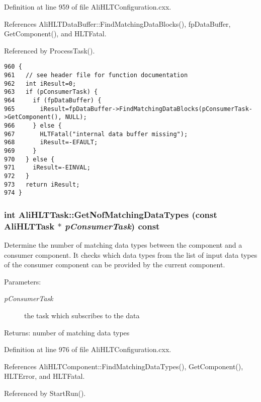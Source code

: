 Definition at line 959 of file Ali\-HLTConfiguration.cxx.

References Ali\-HLTData\-Buffer::Find\-Matching\-Data\-Blocks(), fp\-Data\-Buffer, Get\-Component(), and HLTFatal.

Referenced by Process\-Task().

\footnotesize\begin{verbatim}960 {
961   // see header file for function documentation
962   int iResult=0;
963   if (pConsumerTask) {
964     if (fpDataBuffer) {
965       iResult=fpDataBuffer->FindMatchingDataBlocks(pConsumerTask->GetComponent(), NULL);
966     } else {
967       HLTFatal("internal data buffer missing");
968       iResult=-EFAULT;
969     }
970   } else {
971     iResult=-EINVAL;
972   }
973   return iResult;
974 }
\end{verbatim}\normalsize 


\subsubsection{\setlength{\rightskip}{0pt plus 5cm}int Ali\-HLTTask::Get\-Nof\-Matching\-Data\-Types (const {\bf Ali\-HLTTask} $\ast$ {\em p\-Consumer\-Task}) const}\label{classAliHLTTask_a22}


Determine the number of matching data types between the component and a consumer component. It checks which data types from the list of input data types of the consumer component can be provided by the current component. \begin{Desc}
\item[Parameters:]
\begin{description}
\item[{\em p\-Consumer\-Task}]the task which subscribes to the data \end{description}
\end{Desc}
\begin{Desc}
\item[Returns:]number of matching data types \end{Desc}


Definition at line 976 of file Ali\-HLTConfiguration.cxx.

References Ali\-HLTComponent::Find\-Matching\-Data\-Types(), Get\-Component(), HLTError, and HLTFatal.

Referenced by Start\-Run().

